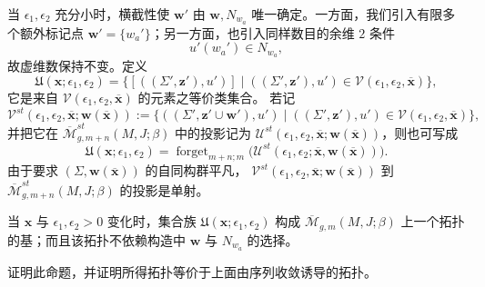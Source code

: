 当 $\epsilon_1,\epsilon_2$ 充分小时，横截性使 $\boldsymbol w'$ 由
$\boldsymbol w,N_{w_a}$ 唯一确定。一方面，我们引入有限多个额外标记点
$\boldsymbol w'=\{w_a'\}$；另一方面，也引入同样数目的余维 $2$ 条件
\begin{equation}
 u'(w_a')\in N_{w_a},
 \label{eq:normal-slice-incidence-condition}
\end{equation}
故虚维数保持不变。定义
\begin{equation}
 \mathfrak U(\mathbf x;\epsilon_1,\epsilon_2)
 =\{[((\Sigma',\boldsymbol z'),u')]\mid
 ((\Sigma',\boldsymbol z'),u')
 \in\mathcal V(\epsilon_1,\epsilon_2,\overline{\mathbf x})\},
 \label{eq:general-stable-map-neighborhood}
\end{equation}
它是来自 $\mathcal V(\epsilon_1,\epsilon_2,\overline{\mathbf x})$ 的元素之等价类集合。
若记
\[
 \mathcal V^{st}(\epsilon_1,\epsilon_2,
 \overline{\mathbf x};\boldsymbol w(\overline{\mathbf x}))
 :=\{((\Sigma',\boldsymbol z'\cup\boldsymbol w'),u')
 \mid ((\Sigma',\boldsymbol z'),u')
 \in\mathcal V(\epsilon_1,\epsilon_2,\overline{\mathbf x})\},
\]
并把它在
$\overline{\mathcal M}_{g,m+n}^{st}(M,J;\beta)$ 中的投影记为
$\mathcal U^{st}(\epsilon_1,\epsilon_2,
\overline{\mathbf x};\boldsymbol w(\overline{\mathbf x}))$，则也可写成
\begin{equation}
 \mathfrak U(\mathbf x;\epsilon_1,\epsilon_2)
 =\operatorname{forget}_{m+n;m}
 \bigl(\mathcal U^{st}(\epsilon_1,\epsilon_2;
 \overline{\mathbf x},\boldsymbol w(\overline{\mathbf x}))\bigr).
 \label{eq:general-neighborhood-forgetful-image}
\end{equation}
由于要求 $(\Sigma,\boldsymbol w(\overline{\mathbf x}))$ 的自同构群平凡，
$\mathcal V^{st}(\epsilon_1,\epsilon_2,
\overline{\mathbf x};\boldsymbol w(\overline{\mathbf x}))$ 到
$\overline{\mathcal M}_{g,m+n}^{st}(M,J;\beta)$ 的投影是单射。

\begin{proposition}\label{prop:stable-map-topology-neighborhood-basis}
当 $\mathbf x$ 与 $\epsilon_1,\epsilon_2>0$ 变化时，集合族
$\mathfrak U(\mathbf x;\epsilon_1,\epsilon_2)$ 构成
$\overline{\mathcal M}_{g,m}(M,J;\beta)$ 上一个拓扑的基；而且该拓扑不依赖构造中
$\boldsymbol w$ 与 $N_{w_a}$ 的选择。
\end{proposition}

\begin{exercise}\label{ex:stable-map-topology-equivalent-sequential}
证明此命题，并证明所得拓扑等价于上面由序列收敛诱导的拓扑。
\end{exercise}

